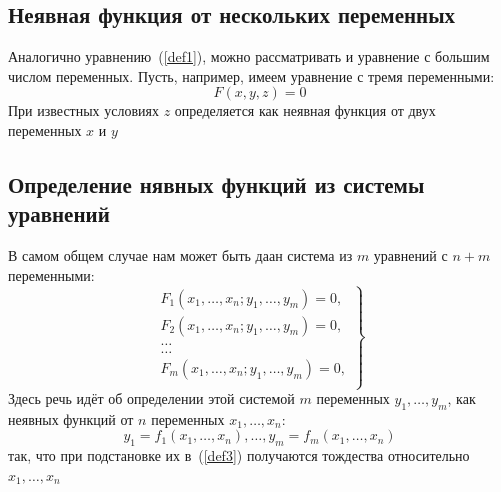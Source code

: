 \subsection{Неявная функция от нескольких переменных}

Аналогично уравнению~(\ref{def1}), можно рассматривать и уравнение с большим числом переменных. Пусть, например, имеем уравнение с тремя переменными:
\begin{equation}\label{def3}
    F(x, y, z) = 0
\end{equation}
При известных условиях $z$ определяется как неявная функция от двух переменных $x$ и $y$

\subsection{Определение нявных функций из системы уравнений}

В самом общем случае нам может быть даан система из $m$ уравнений с $n + m$ переменными:
\begin{equation}\label{eq4}
    \left.
    \begin{array}{c}
        F_1(x_1, \dots, x_n; y_1, \dots, y_m) = 0,\\
        F_2(x_1, \dots, x_n; y_1, \dots, y_m) = 0,\\
        \dots\\
        \dots\\
        F_m(x_1, \dots, x_n; y_1, \dots, y_m) = 0,\\
    \end{array}
    \right\}
\end{equation}
Здесь речь идёт об определении этой системой $m$ переменных $y_1, \dots, y_m$, как неявных функций от $n$ переменных $x_1, \dots, x_n$:
\begin{equation*}
    y_1 = f_1(x_1, \dots, x_n), \dots, y_m = f_m(x_1, \dots, x_n)
\end{equation*}
так, что при подстановке их в~(\ref{def3}) получаются тождества относительно $x_1, \dots, x_n$
